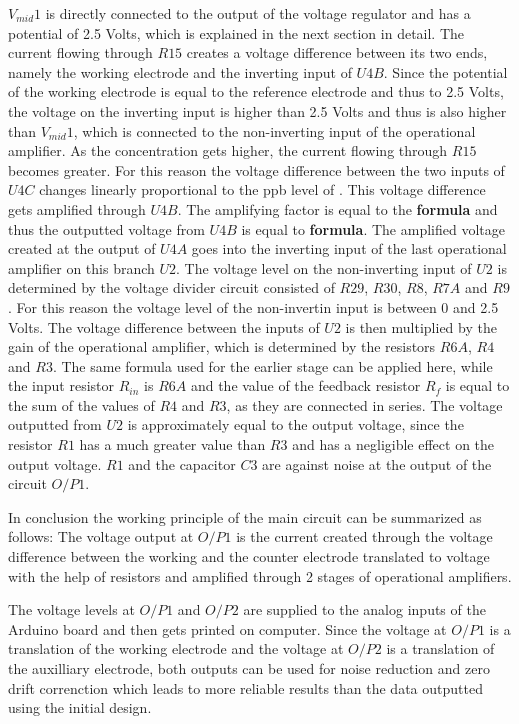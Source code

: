$V_{mid}1$ is directly connected to the output of the voltage regulator and has a potential of 2.5 Volts, which is explained in the next section in detail. The current flowing through $R15$ creates a voltage difference between its two ends, namely the working electrode and the inverting input of $U4B$. Since the potential of the working electrode is equal to the reference electrode and thus to 2.5 Volts, the voltage on the inverting input is higher than 2.5 Volts and thus is also higher than $V_{mid}1$, which is connected to the non-inverting input of the operational amplifier. As the  concentration gets higher, the current flowing through $R15$ becomes greater. For this reason the voltage difference between the two inputs of $U4C$ changes linearly proportional to the ppb level of . This voltage difference gets amplified through $U4B$. The amplifying factor is equal to the \textbf{formula} and thus the outputted voltage from $U4B$ is equal to \textbf{formula}. The amplified voltage created at the output of $U4A$ goes into the inverting input of the last operational amplifier on this branch $U2$. The voltage level on the non-inverting input of $U2$ is determined by the voltage divider circuit consisted of $R29$, $R30$, $R8$, $R7A$ and $R9$. For this reason the voltage level of the non-invertin input is between 0 and 2.5 Volts. The voltage difference between the inputs of $U2$ is then multiplied by the gain of the operational amplifier, which is determined by the resistors $R6A$, $R4$ and $R3$. The same formula used for the earlier stage can be applied here, while the input resistor $R_{in}$ is $R6A$ and the value of the feedback resistor $R_f$ is equal to the sum of the values of $R4$ and $R3$, as they are connected in series. The voltage outputted from $U2$ is approximately equal to the output voltage, since the resistor $R1$ has a much greater value than $R3$ and has a negligible effect on the output voltage. $R1$ and the capacitor $C3$ are against noise at the output of the circuit $O/P1$.\par 
In conclusion the working principle of the main circuit can be summarized as follows: The voltage  output at $O/P1$ is the current created through the voltage difference between the working and the counter electrode translated to voltage with the help of resistors and amplified through 2 stages of operational amplifiers.\par 
The voltage levels at $O/P1$ and $O/P2$ are supplied to the analog inputs of the Arduino board and then gets printed on computer. Since the voltage at $O/P1$ is a translation of the working electrode and the voltage at $O/P2$ is a translation of the auxilliary electrode, both outputs can be used for noise reduction and zero drift correnction which leads to more reliable results than the data outputted using the initial design.


